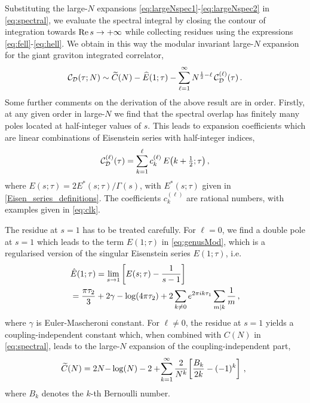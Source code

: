 \documentclass[aps,prl,twocolumn, longbibliography,footinbib,superscriptaddress, preprintnumbers]{revtex4-1}
\newcommand{\<}{\langle}
\renewcommand{\>}{\rangle}
\def\cD{{\cal D}}
\def\Re{{\rm Re \,}}
\begin{document}
Substituting the large-$N$ expansions \eqref{eq:largeNspec1}-\eqref{eq:largeNspec2} in \eqref{eq:spectral}, we evaluate the spectral integral by closing the contour of integration towards $\Re s\to +\infty$ while collecting residues using the expressions \eqref{eq:fell}-\eqref{eq:hell}.
We obtain in this way the modular invariant large-$N$ expansion for the giant graviton integrated correlator,
\begin{equation}
\mathcal{C}_\mathcal{D}(\tau;N) \sim \widetilde{{C}}(N) -\widehat{E}(1; \tau) - \sum_{\ell=1}^{\infty} N^{{1 \over 2}-\ell} \, \mathcal{C}_{\cD}^{(\ell)}(\tau)\, . \label{eq:genusMod}
\end{equation}
Some further comments on the derivation of the above result are in order.
Firstly, at any given order in large-$N$ we find that the spectral overlap has finitely many poles located at half-integer values of $s$.
This leads to expansion coefficients which are linear combinations of Eisenstein series with half-integer indices,
\begin{align} \label{eq:lDD}
\mathcal{C}_{\cD}^{(\ell)}(\tau) = \sum_{k=1}^{\ell} c^{(\ell)}_{k}\, E\big(k+ \tfrac{1}{2}; \tau \big) \, ,
\end{align}
where
$ E(s;\tau) = 2E^*(s;\tau)/\Gamma(s) $,
with $E^*(s;\tau)$ given in \eqref{Eisen_series_definitions}.
The coefficients $c^{(\ell)}_{k}$ are rational numbers, with examples given in
\eqref{eq:clk}.

The residue at $s=1$ has to be treated carefully. For $\ell=0$, we find a double pole at $s=1$ which leads to the term $\hat{E}(1;\tau)$ in \eqref{eq:genusMod}, which is a regularised version of the singular Eisenstein series $E(1;\tau)$, i.e.
\begin{align} \label{eq:E1}
&\notag \hat{E}(1;\tau) = \lim_{s\to 1} \left[E(s;\tau) - \frac{1}{s-1}\right] \\
&= \frac{\pi \tau_2}{3} +2\gamma -\log(4\pi \tau_2)
 + 2\sum_{k\neq 0}  e^{2\pi i k\tau_1}\sum_{m|k} {1 \over m}\,,
\end{align}
where $\gamma$ is Euler-Mascheroni constant. For $\ell\neq 0$, the residue at $s=1$ yields a coupling-independent constant
which, when combined with $C(N)$ in \eqref{eq:spectral},
leads to the large-$N$ expansion of the coupling-independent part,
\begin{align}
\!\! \widetilde{{C}}(N) =  2N {-} \log(N) - 2 +\! \sum_{k=1}^{\infty}  {2 \over N^k } \!  \left[\frac{B_k}{2k}- (-1)^k\right] \, ,
\end{align}
 where $B_k$ denotes the $k$-th Bernoulli number.
\end{document}
